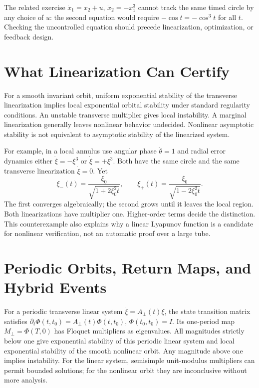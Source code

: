 \documentclass[12pt, openany]{book}
\theoremstyle{plain}
\begin{document}
The related exercise $\dot x_1=x_2+u$, $\dot x_2=-x_1^3$ cannot track the
same timed circle by any choice of $u$: the second equation would require
$-\cos t=-\cos^3t$ for all $t$. Checking the uncontrolled equation should
precede linearization, optimization, or feedback design.

\section{What Linearization Can Certify}

For a smooth invariant orbit, uniform exponential stability of the transverse
linearization implies local exponential orbital stability under standard
regularity conditions. An unstable transverse multiplier gives local
instability. A marginal linearization generally leaves nonlinear behavior
undecided. Nonlinear asymptotic stability is not equivalent to asymptotic
stability of the linearized system.

For example, in a local annulus use angular phase $\dot\theta=1$ and radial
error dynamics either $\dot\xi=-\xi^3$ or $\dot\xi=+\xi^3$. Both have the
same circle and the same transverse linearization $\dot\xi=0$. Yet
\begin{equation}\label{eq:orbital_nonlinear_marginal}
 \xi_-(t)=\frac{\xi_0}{\sqrt{1+2\xi_0^2t}},\qquad
 \xi_+(t)=\frac{\xi_0}{\sqrt{1-2\xi_0^2t}}.
\end{equation}
The first converges algebraically; the second grows until it leaves the local
region. Both linearizations have multiplier one. Higher-order terms decide
the distinction. This counterexample also explains why a linear Lyapunov
function is a candidate for nonlinear verification, not an automatic proof
over a large tube.

\section{Periodic Orbits, Return Maps, and Hybrid Events}

For a periodic transverse linear system $\dot\xi=A_\perp(t)\xi$, the state
transition matrix satisfies $\partial_t\Phi(t,t_0)=A_\perp(t)\Phi(t,t_0)$,
$\Phi(t_0,t_0)=I$. Its one-period map $M_\perp=\Phi(T,0)$ has Floquet
multipliers as eigenvalues. All magnitudes strictly below one give exponential
stability of this periodic linear system and local exponential stability of
the smooth nonlinear orbit. Any magnitude above one implies instability.
For the linear system, semisimple unit-modulus multipliers can permit bounded
solutions; for the nonlinear orbit they are inconclusive without more analysis.
\end{document}
